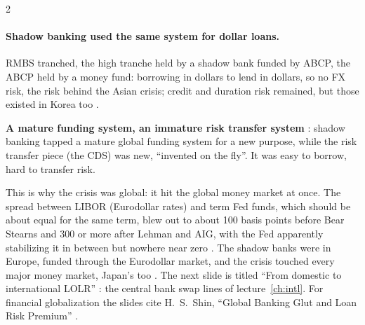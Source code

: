 \begin{paracol}{2}
\paragraph{Shadow banking used the same system for dollar loans.} RMBS tranched, the high tranche held by a shadow bank funded by ABCP, the ABCP held by a money fund:
borrowing in dollars to lend in dollars, so no FX risk, the risk behind the Asian crisis; credit and duration risk remained, but those existed in Korea too
.

\begin{nfigure}
\begin{taccts}
\quad
{}\quad
{}
\end{taccts}
\begin{taccts}
\quad
{}\quad
{}
\end{taccts}
\caption{Shadow banking as global banking: the same dollar funding chain for Korean development lending and for US mortgages .}\label{fig:cbs-global}
\end{nfigure}

\begin{keyformulas}
\textbf{A mature funding system, an immature risk transfer system} : shadow banking tapped a mature global
funding system for a new purpose, while the risk transfer piece (the CDS) was new, ``invented on the fly''. It was easy to borrow, hard to transfer risk.
\end{keyformulas}

This is why the crisis was global: it hit the global money market at once. The spread between LIBOR (Eurodollar rates) and term Fed funds, which should be about equal
for the same term, blew out to about 100 basis points before Bear Stearns and 300 or more after Lehman and AIG, with the Fed apparently stabilizing it in between but
nowhere near zero . The shadow banks were in Europe, funded through the Eurodollar market,
and the crisis touched every major money market, Japan's too . The next slide is titled ``From domestic to international
LOLR'' : the central bank swap lines of lecture~\ref{ch:intl}. For financial globalization the slides cite H.~S.~Shin, ``Global Banking Glut and Loan Risk
Premium'' .


\end{paracol}

